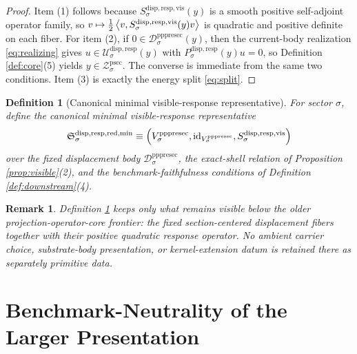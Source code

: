 \documentclass[11pt]{article}
\newcommand{\ProtoSectionShell}[1]{\mathcal Z_{#1}^{\mathrm{psec}}}
\newcommand{\PrePreProtoSectionVertical}[1]{V_{#1}^{\mathrm{pppresec}}}
\newcommand{\PrePreProtoSectionResidualBody}[1]{\mathcal D_{#1}^{\mathrm{pppresec}}}
\newcommand{\SubstrateBody}[1]{\mathcal U_{#1}^{\mathrm{disp,resp}}}
\newcommand{\SubstrateProjection}[1]{P_{#1}^{\mathrm{disp,resp}}}
\newcommand{\VisibleResponseOperator}[1]{S_{#1}^{\mathrm{disp,resp,vis}}}
\newcommand{\MinimalReducedStructure}{\mathfrak S^{\mathrm{disp,resp,red,min}}}
\newtheorem{definition}{Definition}
\newtheorem{remark}{Remark}
\begin{document}
\begin{proof}
Item (1) follows because \(\VisibleResponseOperator{\sigma}(y)\) is a smooth positive self-adjoint operator family, so \(v\mapsto \frac12\ev{v,\VisibleResponseOperator{\sigma}(y)v}\) is quadratic and positive definite on each fiber. For item (2), if \(0\in\PrePreProtoSectionResidualBody{\sigma}(y)\), then the current-body realization \eqref{eq:realizing} gives \(u\in\SubstrateBody{\sigma}(y)\) with \(\SubstrateProjection{\sigma}(y)u=0\), so Definition \ref{def:core}(5) yields \(y\in\ProtoSectionShell{\sigma}\). The converse is immediate from the same two conditions. Item (3) is exactly the energy split \eqref{eq:split}.
\end{proof}

\begin{definition}[Canonical minimal visible-response representative]
\label{def:minimal}
For sector \(\sigma\), define the \emph{canonical minimal visible-response representative}
\[
\MinimalReducedStructure_{\sigma}
\equiv
\Bigl(
\PrePreProtoSectionVertical{\sigma},
\mathrm{id}_{\PrePreProtoSectionVertical{\sigma}},
\VisibleResponseOperator{\sigma}
\Bigr)
\]
over the fixed displacement body \(\PrePreProtoSectionResidualBody{\sigma}\), the exact-shell relation of Proposition \ref{prop:visible}(2), and the benchmark-faithfulness conditions of Definition \ref{def:downstream}(4).
\end{definition}

\begin{remark}
Definition \ref{def:minimal} keeps only what remains visible below the older projection-operator-core frontier: the fixed section-centered displacement fibers together with their positive quadratic response operator. No ambient carrier choice, substrate-body presentation, or kernel-extension datum is retained there as separately primitive data.
\end{remark}

\section{Benchmark-Neutrality of the Larger Presentation}
\end{document}
